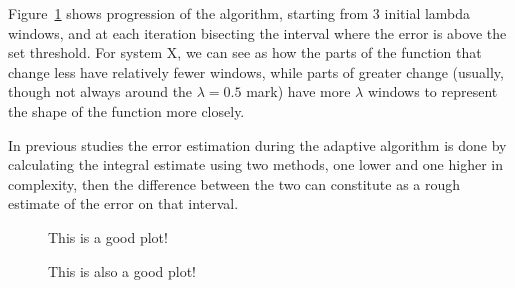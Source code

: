 Figure~\ref{fig:adapconv}   shows progression of the
algorithm, starting from 3 initial lambda windows, and at each iteration
bisecting the interval where the error is above the set threshold. For system X,
we can see as how the parts of the function that change less have relatively
fewer windows, while parts of greater change (usually, though not always around
the $\lambda=0.5$ mark) have more $\lambda$ windows to represent the shape of
the function more closely.

 In previous studies \cite{} the
error estimation during the adaptive algorithm is done by calculating the
integral estimate using two methods, one lower and one higher in complexity,
then the difference between the two can constitute as a rough estimate of the
error on that interval.

\begin{figure}
  
  \caption{This is a good plot!}
  \label{fig:adapconv}
\end{figure}

\begin{figure}
  
  \caption{This is also a good plot!}
  \label{fig:savings}
\end{figure}
